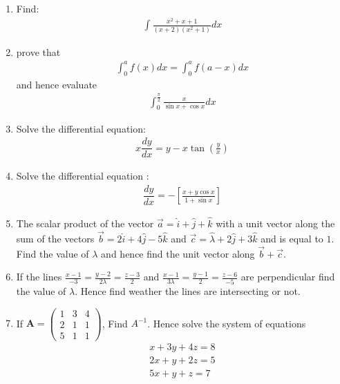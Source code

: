 \documentclass[12pt,-letter paper]{article}
\providecommand{\sbrak}[1]{\ensuremath{{}\left[#1\right]}}
\providecommand{\brak}[1]{\ensuremath{\left(#1\right)}}
\theoremstyle{remark}
\newcommand{\myvec}[1]{\ensuremath{\begin{pmatrix}#1\end{pmatrix}}}
\let\vec\mathbf
\begin{document}
\begin{enumerate}
\item Find: \begin{align*}\int{\frac{x^2+x+1}{\brak{x+2}\brak{x^2+1}}}dx\end{align*}

\item prove that 
\begin{align*}
    \int_{0}^{a} f\brak{x}dx = \int_{0}^{a} f\brak{a-x}dx
\end{align*}
and hence evaluate 
\begin{align*}
\int_{0}^{\frac{\pi}{2}}\frac{x}{{\sin x}+{\cos x}}dx
\end{align*}

\item Solve the differential equation: 
\begin{align*}
{x}\dfrac{dy}{dx}= {y}-{x}\tan\brak{\frac{y}{x}}
\end{align*}

\item Solve the differential equation : 
\begin{align*}
\dfrac{dy}{dx}= -\sbrak{\frac{x+y\cos x}{1+\sin x}}
\end{align*}

\item The scalar product of the vector $\overrightarrow{a} = \hat{i}+\hat{j}+\hat{k}$ with a unit vector along the sum of the vectors $\overrightarrow{b} = 2\hat{i}+4\hat{j}-5\hat{k}$ and $\overrightarrow{c} = \hat{\lambda}+2\hat{j}+3\hat{k}$ and is equal to $1$. Find the value of $\lambda$ and hence find the unit vector along $\overrightarrow{b}+\overrightarrow{c}$.

\item If the lines $\frac{x-1}{-3}=\frac{y-2}{2\lambda}=\frac{z-3}{2}$ and $\frac{x-1}{3\lambda}=\frac{y-1}{2}=\frac{z-6}{-5}$ are perpendicular find the value of $\lambda$. Hence find weather the lines are intersecting or not.

\item If ${\vec{A}} = \myvec{1&3&4\\2&1&1\\5&1&1}$, Find $A^{-1}$.
        Hence solve the system of equations 
            \begin{align*}
                {x+3y+4z}=8 \\
                {2x+y+2z}=5 \\
                {5x+y+z} =7
            \end{align*}    
                

\end{enumerate}
\end{document}
